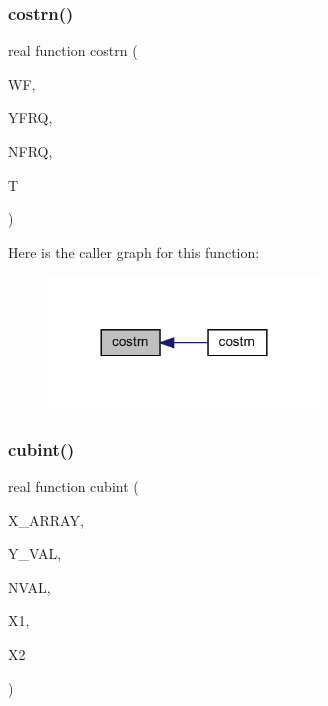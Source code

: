 \subsubsection{\texorpdfstring{costrn()}{costrn()}}
{\footnotesize\ttfamily real function costrn (\begin{DoxyParamCaption}\item[{real, dimension(nfrq), intent(in)}]{WF,  }\item[{real, dimension(4,nfrq), intent(in)}]{Y\+F\+RQ,  }\item[{integer, intent(in)}]{N\+F\+RQ,  }\item[{real, intent(in)}]{T }\end{DoxyParamCaption})}

Here is the caller graph for this function\+:\nopagebreak
\begin{figure}[H]
\begin{center}
\leavevmode
\includegraphics[width=204pt]{Leroi_8f90_a12a40dde1170214455093566ef5e8bb4_icgraph}
\end{center}
\end{figure}
\mbox{\label{Leroi_8f90_aee021b0986763ff84e2a9373cd2c5b9f}} 
\subsubsection{\texorpdfstring{cubint()}{cubint()}}
{\footnotesize\ttfamily real function cubint (\begin{DoxyParamCaption}\item[{real, dimension(nval)}]{X\+\_\+\+A\+R\+R\+AY,  }\item[{real, dimension(4,nval)}]{Y\+\_\+\+V\+AL,  }\item[{integer}]{N\+V\+AL,  }\item[{real}]{X1,  }\item[{real}]{X2 }\end{DoxyParamCaption})}

